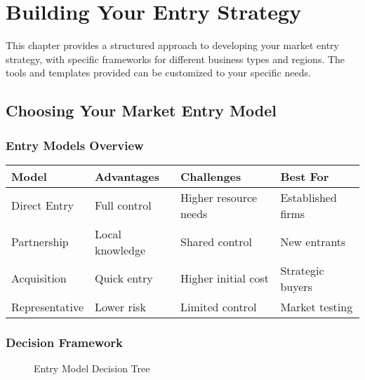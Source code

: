 
\chapter{Building Your Entry Strategy}

\begin{importantbox}
This chapter provides a structured approach to developing your market entry strategy, with specific frameworks for different business types and regions. The tools and templates provided can be customized to your specific needs.
\end{importantbox}

\section{Choosing Your Market Entry Model}

\subsection{Entry Models Overview}
\begin{center}
\begin{tabular}{p{}|p{}|p{}|p{}}
    \textbf{Model} & \textbf{Advantages} & \textbf{Challenges} & \textbf{Best For} \\
    \hline
    Direct Entry & Full control & Higher resource needs & Established firms \\
    Partnership & Local knowledge & Shared control & New entrants \\
    Acquisition & Quick entry & Higher initial cost & Strategic buyers \\
    Representative & Lower risk & Limited control & Market testing \\
\end{tabular}
\end{center}

\subsection{Decision Framework}
\begin{figure}[h]
    \centering
    \caption{Entry Model Decision Tree}
\end{figure}

